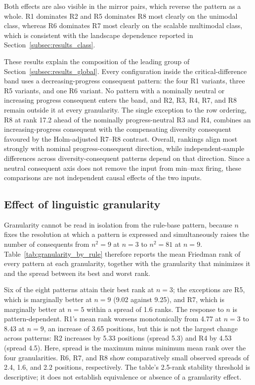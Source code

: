 Both effects are also visible in the mirror pairs, which reverse the pattern as a whole. R1 dominates R2 and R5 dominates R8 most clearly on the unimodal class, whereas R6 dominates R7 most clearly on the scalable multimodal class, which is consistent with the landscape dependence reported in Section~\ref{subsec:results_class}.

These results explain the composition of the leading group of Section~\ref{subsec:results_global}. Every configuration inside the critical-difference band uses a decreasing-progress consequent pattern: the four R1 variants, three R5 variants, and one R6 variant. No pattern with a nominally neutral or increasing progress consequent enters the band, and R2, R3, R4, R7, and R8 remain outside it at every granularity. The single exception to the row ordering, R8 at rank 17.2 ahead of the nominally progress-neutral R3 and R4, combines an increasing-progress consequent with the compensating diversity consequent favoured by the Holm-adjusted R7--R8 contrast. Overall, rankings align most strongly with nominal progress-consequent direction, while independent-sample differences across diversity-consequent patterns depend on that direction. Since a neutral consequent axis does not remove the input from min--max firing, these comparisons are not independent causal effects of the two inputs.

\subsection{Effect of linguistic granularity}
\label{subsec:results_granularity}

Granularity cannot be read in isolation from the rule-base pattern, because $n$ fixes the resolution at which a pattern is expressed and simultaneously raises the number of consequents from $n^2 = 9$ at $n=3$ to $n^2 = 81$ at $n=9$. Table~\ref{tab:granularity_by_rule} therefore reports the mean Friedman rank of every pattern at each granularity, together with the granularity that minimizes it and the spread between its best and worst rank.



Six of the eight patterns attain their best rank at $n=3$; the exceptions are R5, which is marginally better at $n=9$ (9.02 against 9.25), and R7, which is marginally better at $n=5$ within a spread of 1.6 ranks. The response to $n$ is pattern-dependent. R1's mean rank worsens monotonically from 4.77 at $n=3$ to 8.43 at $n=9$, an increase of 3.65 positions, but this is not the largest change across patterns: R2 increases by 5.33 positions (spread 5.3) and R4 by 4.53 (spread 4.5). Here, spread is the maximum minus minimum mean rank over the four granularities. R6, R7, and R8 show comparatively small observed spreads of 2.4, 1.6, and 2.2 positions, respectively. The table's 2.5-rank stability threshold is descriptive; it does not establish equivalence or absence of a granularity effect.

